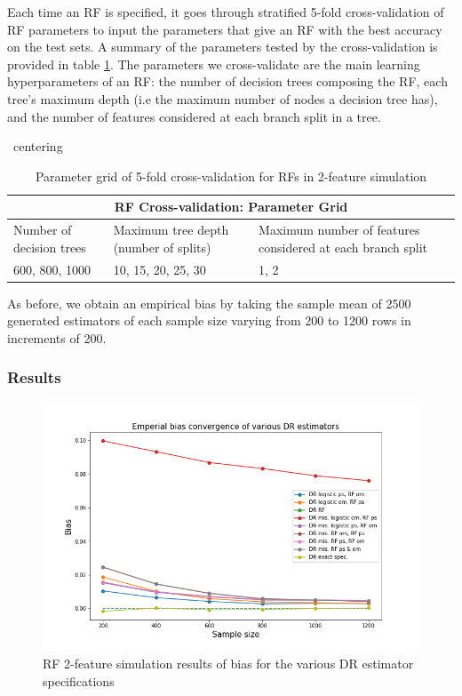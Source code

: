 \documentclass[12pt,twoside]{article}
\begin{document}
Each time an RF is specified, it goes through stratified 5-fold cross-validation of RF parameters to input the parameters that give an RF with the best accuracy on the test sets. A summary of the parameters tested by the cross-validation is provided in table \ref{tableRF}. The parameters we cross-validate are the main learning hyperparameters of an RF: the number of decision trees composing the RF, each tree's maximum depth (i.e the maximum number of nodes a decision tree has), and the number of features considered at each branch split in a tree. \\
\begin{table}[]
    \ centering
\begin{tabular}{ |p{3cm}|p{3cm}|p{3cm}| }
 \hline
 \multicolumn{3}{|c|}{RF Cross-validation: Parameter Grid} \\
 \hline
 Number of decision trees & Maximum tree depth (number of splits)  & Maximum    number of features considered at each branch split\\
 \hline
 600, 800, 1000& 10, 15, 20, 25, 30 & 1, 2 \\
 \hline 
\end{tabular}
\caption{Parameter grid of 5-fold cross-validation for RFs in 2-feature simulation}
\label{tableRF}
\end{table}

As before, we obtain an empirical bias by taking the sample mean of 2500 generated estimators of each sample size varying from 200 to 1200 rows in increments of 200. 

\subsubsection*{Results}

\begin{figure}[h!]
    \centering
    \includegraphics[width = 0.9\columnwidth]{figures/biasRF.png}
    \caption{RF 2-feature simulation results of bias for the various DR estimator specifications}
    \label{figbiasRF}
\end{figure}
\end{document}
